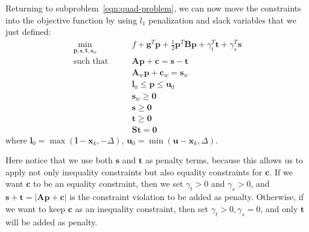 \documentclass[12pt]{article}
\newcommand{\mb}{\mathbf}
\begin{document}
Returning to subproblem~\eqref{eqn:quad-problem}, we can now move the constraints into the objective function by using $l_1$ penalization and slack variables that we just defined:
%
\begin{equation}
  \label{eqn:quad-problem-penalty}
  \begin{aligned}
    \min_{\mb{p}, \mb{s}, \mb{t}, \mb{s}_w} \qquad & f + \mb{g}^T\mb{p} + \frac{1}{2}\mb{p}^T\mb{B}\mb{p} + \gamma_t^T\mb{t} + \gamma_s^T\mb{s}\\
    \text{such that} \qquad
    & \mb{A}\mb{p} + \mb{c} = \mb{s} - \mb{t} \\
    & \mb{A}_{w}\mb{p} + \mb{c}_{w} = \mb{s}_w \\
    & \mb{l}_0 \le \mb{p} \le \mb{u}_0 \\
    & \mb{s}_w \ge \mb{0} \\
    & \mb{s} \ge \mb{0} \\
    & \mb{t} \ge \mb{0} \\
    & \mb{S} \mb{t} = \mb{0}
  \end{aligned}
\end{equation}
%
where $\mb{l}_0 = \max(\mb{l} - \mb{x}_k, -\Delta)$, $\mb{u}_0 = \min(\mb{u} - \mb{x}_k, \Delta)$.

Here notice that we use both $\mb{s}$ and $\mb{t}$ as penalty terms, because this allows us to apply not only inequality constraints but also equality constraints for $\mb{c}$.
If we want $\mb{c}$ to be an equality constraint, then we set $\gamma_t > 0$ and $\gamma_s > 0$, and $\mb{s} + \mb{t} = |\mb{A}\mb{p} + \mb{c}|$ is the constraint violation to be added as penalty.
Otherwise, if we want to keep $\mb{c}$ as an inequality constraint, then set $\gamma_t > 0, \gamma_s = 0$, and only $\mb{t}$ will be added as penalty.
\end{document}
